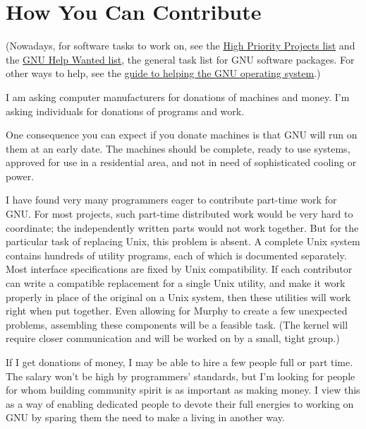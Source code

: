\section{How You Can Contribute}
(Nowadays, for software tasks to work on, see the \href{http://fsf.org/campaigns/priority-projects}{High Priority Projects list} and the \href{http://savannah.gnu.org/people/?type_id=1}{GNU Help Wanted list}, the general task list for GNU software packages. For other ways to help, see the \href{http://www.gnu.org/help/help.html}{guide to helping the GNU operating system}.)\par
I am asking computer manufacturers for donations of machines and money. I'm asking individuals for donations of programs and work.\par
One consequence you can expect if you donate machines is that GNU will run on them at an early date. The machines should be complete, ready to use systems, approved for use in a residential area, and not in need of sophisticated cooling or power.\par
I have found very many programmers eager to contribute part-time work for GNU. For most projects, such part-time distributed work would be very hard to coordinate; the independently written parts would not work together. But for the particular task of replacing Unix, this problem is absent. A complete Unix system contains hundreds of utility programs, each of which is documented separately. Most interface specifications are fixed by Unix compatibility. If each contributor can write a compatible replacement for a single Unix utility, and make it work properly in place of the original on a Unix system, then these utilities will work right when put together. Even allowing for Murphy to create a few unexpected problems, assembling these components will be a feasible task. (The kernel will require closer communication and will be worked on by a small, tight group.)\par
If I get donations of money, I may be able to hire a few people full or part time. The salary won't be high by programmers' standards, but I'm looking for people for whom building community spirit is as important as making money. I view this as a way of enabling dedicated people to devote their full energies to working on GNU by sparing them the need to make a living in another way.
